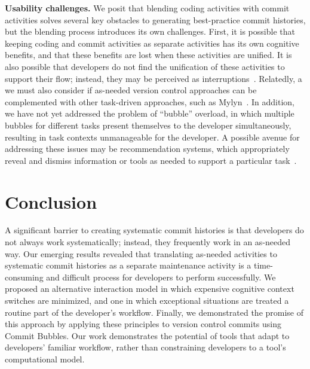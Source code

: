 \documentclass[conference]{IEEEtran}
\begin{document}
\textbf{Usability challenges.} We posit that blending coding activities with commit activities solves several key obstacles to generating best-practice commit histories, but the blending process introduces its own challenges. 
First, it is possible that keeping coding and commit activities as separate activities has its own cognitive benefits, and that these benefits are lost when these activities are unified. 
It is also possible that developers do not find the unification of these activities to support their flow; instead, they may be perceived as interruptions~\cite{Parnin2012}.
% 
Relatedly, a we must also consider if as-needed version control approaches can be complemented with other task-driven approaches, such as Mylyn~\cite{Kersten2006}.
%
In addition, we have not yet addressed the problem of ``bubble'' overload, in which multiple bubbles for different tasks present themselves to the developer simultaneously, resulting in task contexts unmanageable for the developer.
A possible avenue for addressing these issues may be recommendation systems, which appropriately reveal and dismiss information or tools as needed to support a particular task~\cite{Robillard2010a,Murphy2005}.

\balance

\section{Conclusion}

A significant barrier to creating systematic commit histories is that developers do not always work systematically; instead, they frequently work in an as-needed way. 
Our emerging results revealed that translating as-needed activities to systematic commit histories as a separate maintenance activity is a time-consuming and difficult process for developers to perform successfully. 
We proposed an alternative interaction model in which expensive cognitive context switches are minimized, and one in which exceptional situations
are treated a routine part of the developer's workflow. 
Finally, we demonstrated the promise of this approach by applying these principles to version control commits using Commit Bubbles. 
Our work demonstrates the potential of tools that adapt to developers' familiar workflow, rather than constraining developers to a tool's computational model.
\end{document}
